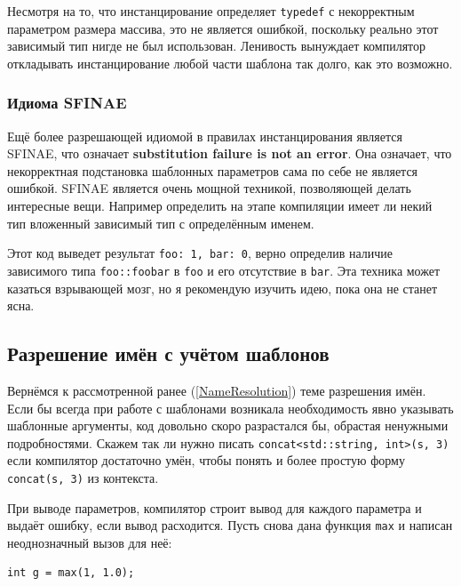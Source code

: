 \documentclass[a4paper,12pt,oneside]{article}
\begin{document}


Несмотря на то, что инстанцирование определяет \lstinline!typedef! с некорректным параметром размера массива, это не является ошибкой, поскольку реально этот зависимый тип нигде не был использован. Ленивость вынуждает компилятор откладывать инстанцирование любой части шаблона так долго, как это возможно.

\subsubsection{Идиома SFINAE}

Ещё более разрешающей идиомой в правилах инстанцирования является SFINAE, что означает \textbf{substitution failure is not an error}. Она означает, что некорректная подстановка шаблонных параметров сама по себе не является ошибкой. SFINAE является очень мощной техникой, позволяющей делать интересные вещи. Например определить на этапе компиляции имеет ли некий тип вложенный зависимый тип с определённым именем.



Этот код выведет результат \lstinline!foo: 1, bar: 0!, верно определив наличие зависимого типа \lstinline!foo::foobar! в \lstinline!foo! и его отсутствие в \lstinline!bar!. Эта техника может казаться взрывающей мозг, но я рекомендую изучить идею, пока она не станет ясна.

\subsection{Разрешение имён с учётом шаблонов}

Вернёмся к рассмотренной ранее (\ref{NameResolution}) теме разрешения имён. Если бы всегда при работе с шаблонами возникала необходимость явно указывать шаблонные аргументы, код довольно скоро разрастался бы, обрастая ненужными подробностями. Скажем так ли нужно писать \lstinline!concat<std::string, int>(s, 3)! если компилятор достаточно умён, чтобы понять и более простую форму \lstinline!concat(s, 3)! из контекста.

При выводе параметров, компилятор строит вывод для каждого параметра и выдаёт ошибку, если вывод расходится. Пусть снова дана функция \lstinline!max! и написан неоднозначный вызов для неё:



\begin{lstlisting}
int g = max(1, 1.0);
\end{lstlisting}
\end{document}
